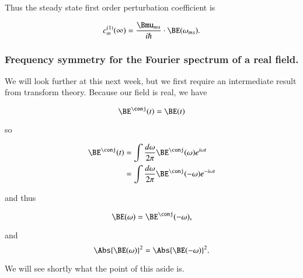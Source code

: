 Thus the steady state first order perturbation coefficient is

\begin{equation}\label{eqn:qmTwoL7:590}
c_m^{(1)}(\infty)
=
\frac{\Bmu_{ms}}{i \hbar} \cdot
\BE(\omega_{ms}).
\end{equation}

\subsubsection{Frequency symmetry for the Fourier spectrum of a real field.}

We will look further at this next week, but we first require an intermediate result from transform theory.  Because our field is real, we have

\begin{equation}\label{eqn:qmTwoL7:610}
\BE^\conj(t) = \BE(t)
\end{equation}

so

\begin{align*}
\BE^\conj(t)
&= \int \frac{d\omega}{2 \pi} \BE^\conj(\omega) e^{i \omega t} \\
&= \int \frac{d\omega}{2 \pi} \BE^\conj(-\omega) e^{-i \omega t} \\
\end{align*}

and thus

\begin{equation}\label{eqn:qmTwoL7:630}
\BE(\omega) = \BE^\conj(-\omega),
\end{equation}

and
\begin{equation}\label{eqn:qmTwoL7:650}
\Abs{\BE(\omega)}^2 = \Abs{\BE(-\omega)}^2.
\end{equation}

We will see shortly what the point of this aside is.

\EndArticle
